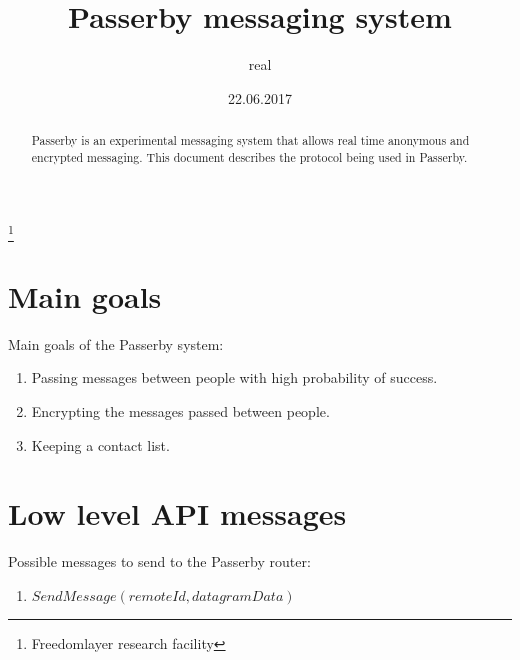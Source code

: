 \documentclass{amsart}
\theoremstyle{definition}
\theoremstyle{remark}
\numberwithin{equation}{section}
\begin{document}
\title{Passerby messaging system}

\author{real}
\thanks{Freedomlayer research facility}



\date{22.06.2017}
\maketitle

\begin{abstract}
  Passerby is an experimental messaging system that allows real time anonymous
  and encrypted messaging. This document describes the protocol being used in
  Passerby.
\end{abstract}

\section{Main goals}

Main goals of the Passerby system:

\begin{enumerate}
  \item Passing messages between people with high probability of success.
  \item Encrypting the messages passed between people.
  \item Keeping a contact list.
\end{enumerate}


\section{Low level API messages}

Possible messages to send to the Passerby router:
\begin{enumerate}
  \item $SendMessage (remoteId, datagramData)$
\end{enumerate}
\end{document}
